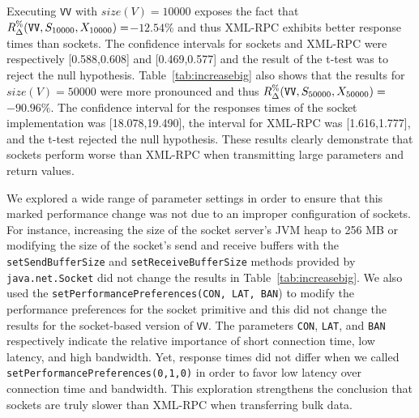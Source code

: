\documentclass{sig-alternate}
\begin{document}

Executing {\tt VV} with $size(V)=10000$ exposes the fact that
{\small$R_\Delta^\%(\mbox{{\tt VV}},S_{10000},X_{10000})=$}$-12.54\%$
and thus XML-RPC exhibits better response times than sockets.  The
confidence intervals for sockets and XML-RPC were respectively
[0.588,0.608] and [0.469,0.577] and the result of the t-test was to
reject the null hypothesis.  Table~\ref{tab:increasebig} also shows
that the results for $size(V)=50000$ were more pronounced and thus
{\small$R_\Delta^\%(\mbox{{\tt VV}},S_{50000},X_{50000})=$}$-90.96\%$.
The confidence interval for the responses times of the socket
implementation was [18.078,19.490], the interval for XML-RPC was
[1.616,1.777], and the t-test rejected the null hypothesis.  These
results clearly demonstrate that sockets perform worse than XML-RPC
when transmitting large parameters and return values.




We explored a wide range of parameter settings in order to ensure that
this marked performance change was not due to an improper
configuration of sockets.  For instance, increasing the size of the
socket server's JVM heap to 256 MB or modifying the size of the
socket's send and receive buffers with the {\tt setSendBufferSize} and
{\tt setReceiveBufferSize} methods provided by {\tt java.net.Socket}
did not change the results in Table~\ref{tab:increasebig}.  We also
used the {\tt setPerformancePreferences(CON, LAT, BAN}) to modify the
performance preferences for the socket primitive and this did not
change the results for the socket-based version of {\tt VV}.  The
parameters {\tt CON}, {\tt LAT}, and {\tt BAN} respectively indicate
the relative importance of short connection time, low latency, and
high bandwidth.  Yet, response times did not differ when we called
{\tt setPerformancePreferences(0,1,0)} in order to favor low latency
over connection time and bandwidth.  This exploration strengthens the
conclusion that sockets are truly slower than XML-RPC when
transferring bulk data.
\end{document}

